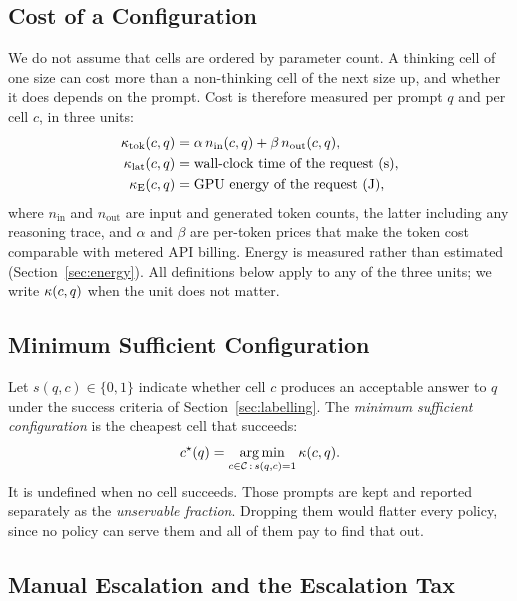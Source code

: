 \subsection{Cost of a Configuration}
\label{sec:cost}

We do not assume that cells are ordered by parameter count. A thinking cell
of one size can cost more than a non-thinking cell of the next size up, and
whether it does depends on the prompt. Cost is therefore measured per
prompt $q$ and per cell $c$, in three units:
\begin{align}
  \kappa_{\mathrm{tok}}(c, q) &= \alpha\, n_{\mathrm{in}}(c, q)
                              + \beta\, n_{\mathrm{out}}(c, q),
  \label{eq:tokcost}\\
  \kappa_{\mathrm{lat}}(c, q) &= \text{wall-clock time of the request (s)},
  \label{eq:latcost}\\
  \kappa_{\mathrm{E}}(c, q)   &= \text{GPU energy of the request (J)},
  \label{eq:energycost}
\end{align}
where $n_{\mathrm{in}}$ and $n_{\mathrm{out}}$ are input and generated
token counts, the latter including any reasoning trace, and $\alpha$ and
$\beta$ are per-token prices that make the token cost comparable with
metered API billing. Energy is measured rather than estimated
(Section~\ref{sec:energy}). All definitions below apply to any of the three
units; we write $\kappa(c, q)$ when the unit does not matter.

\subsection{Minimum Sufficient Configuration}
\label{sec:cstar}

Let $s(q, c) \in \{0, 1\}$ indicate whether cell $c$ produces an acceptable
answer to $q$ under the success criteria of
Section~\ref{sec:labelling}. The \emph{minimum sufficient configuration}
is the cheapest cell that succeeds:
\begin{equation}
  c^{\star}(q) = \operatorname*{arg\,min}_{c \in \mathcal{C} \,:\, s(q, c) = 1} \kappa(c, q).
  \label{eq:cstar}
\end{equation}
It is undefined when no cell succeeds. Those prompts are kept and reported
separately as the \emph{unservable fraction}. Dropping them would flatter
every policy, since no policy can serve them and all of them pay to find
that out.

\subsection{Manual Escalation and the Escalation Tax}
\label{sec:tax}


